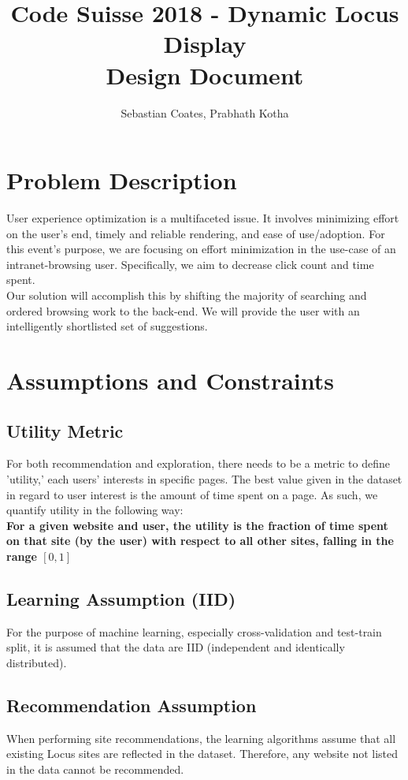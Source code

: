 \documentclass{article}
\title{\textbf{Code Suisse 2018 - Dynamic Locus Display \\ Design Document}}
\author{Sebastian Coates, Prabhath Kotha}
\begin{document}
 
\maketitle{} 
\setlength{\parindent}{0pt}


\clearpage
\section*{Problem Description}
User experience optimization is a multifaceted issue. It involves minimizing effort on the user's end, timely and reliable rendering, and ease of use/adoption. For this event's purpose, we are focusing on effort minimization in the use-case of an intranet-browsing user. Specifically, we aim to decrease click count and time spent. \\

Our solution will accomplish this by shifting the majority of searching and ordered browsing work to the back-end. We will provide the user with an intelligently shortlisted set of suggestions.


\clearpage
\section*{Assumptions and Constraints}
\subsection*{Utility Metric}
For both recommendation and exploration, there needs to be a metric to define 
'utility,' each users' interests in specific pages. The best value given in the
dataset in regard to user interest is the amount of time spent on a page. As such,
we quantify utility in the following way: \\ 
\textbf{For a given website and user, the utility is the fraction of time spent 
on that site (by the user) with respect to all other sites, falling in the range $[0,1]$} \\ 

\subsection*{Learning Assumption (IID)} 
For the purpose of machine learning, especially cross-validation and test-train split,
it is assumed that the data are IID (independent and identically distributed). 

\subsection*{Recommendation Assumption} 
When performing site recommendations, the learning algorithms assume that all
existing Locus sites are reflected in the dataset. Therefore, any website not 
listed in the data cannot be recommended. \\
\end{document}
